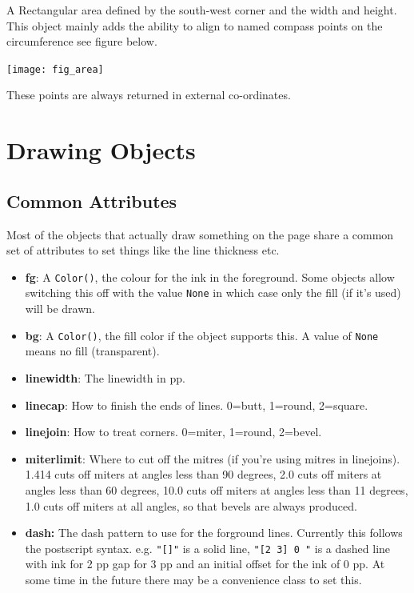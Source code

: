 \documentclass[a4paper]{book}
\begin{document}
A Rectangular area defined by the south-west corner and the width and height.
This object mainly adds the ability to align to named compass points on the 
circumference see figure below.

\begin{center}
  \texttt{[image: fig\_area]}
\end{center}

These points are always returned in external co-ordinates.

\section{Drawing Objects}

\subsection{Common Attributes}
\label{sec:draw-attr}

Most of the objects that actually draw something on the page
share a common set of attributes to set things like the line thickness
etc. 

\begin{itemize}
\item \textbf{fg}: A \Verb|Color()|, the colour for the ink in the
  foreground.  Some objects allow switching this off with the value
  \Verb|None| in which case only the fill (if it's used) will be
  drawn.
\item \textbf{bg}: A \Verb|Color()|, the fill color if the object
  supports this. A value of \Verb|None| means no fill (transparent).
\item \textbf{linewidth}: The linewidth in pp.
\item \textbf{linecap}: How to finish the ends of lines. 0=butt,
  1=round, 2=square.
\item \textbf{linejoin}: How to treat corners. 0=miter, 1=round,
  2=bevel.
\item \textbf{miterlimit}: Where to cut off the mitres (if you're
  using mitres in linejoins). 1.414 cuts off miters at angles less
  than 90 degrees, 2.0 cuts off miters at angles less than 60 degrees,
  10.0 cuts off miters at angles less than 11 degrees, 1.0 cuts off
  miters at all angles, so that bevels are always produced.
\item \textbf{dash:} The dash pattern to use for the forground lines.
  Currently this follows the postscript syntax. e.g. \Verb|"[]"| is a
  solid line, \Verb|"[2 3] 0 "| is a dashed line with ink for 2 pp gap
  for 3 pp and an initial offset for the ink of 0 pp. At some time in
  the future there may be a convenience class to set this.
\end{itemize}
\end{document}
